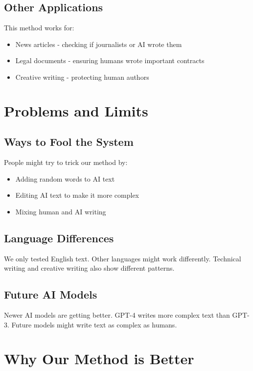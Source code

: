 \documentclass[12pt,a4paper]{report}
\begin{document}
\subsection{Other Applications}

This method works for:
\begin{itemize}
    \item News articles - checking if journalists or AI wrote them
    \item Legal documents - ensuring humans wrote important contracts
    \item Creative writing - protecting human authors
\end{itemize}

\section{Problems and Limits}

\subsection{Ways to Fool the System}

People might try to trick our method by:
\begin{itemize}
    \item Adding random words to AI text
    \item Editing AI text to make it more complex
    \item Mixing human and AI writing
\end{itemize}

\subsection{Language Differences}

We only tested English text. Other languages might work differently. Technical writing and creative writing also show different patterns.

\subsection{Future AI Models}

Newer AI models are getting better. GPT-4 writes more complex text than GPT-3. Future models might write text as complex as humans.

\section{Why Our Method is Better}
\end{document}
